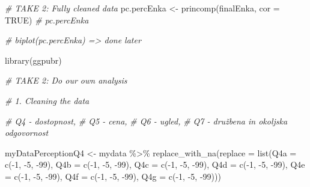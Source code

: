 \documentclass[
]{article}
\newenvironment{Shaded}{\begin{snugshade}}{\end{snugshade}}
\newcommand{\AttributeTok}[1]{\textcolor[rgb]{0.77,0.63,0.00}{#1}}
\newcommand{\CommentTok}[1]{\textcolor[rgb]{0.56,0.35,0.01}{\textit{#1}}}
\newcommand{\ConstantTok}[1]{\textcolor[rgb]{0.00,0.00,0.00}{#1}}
\newcommand{\DecValTok}[1]{\textcolor[rgb]{0.00,0.00,0.81}{#1}}
\newcommand{\FunctionTok}[1]{\textcolor[rgb]{0.00,0.00,0.00}{#1}}
\newcommand{\NormalTok}[1]{#1}
\newcommand{\OtherTok}[1]{\textcolor[rgb]{0.56,0.35,0.01}{#1}}
\newcommand{\SpecialCharTok}[1]{\textcolor[rgb]{0.00,0.00,0.00}{#1}}
\begin{document}
\begin{Shaded}
\begin{Highlighting}[]
\CommentTok{\# TAKE 2: Fully cleaned data}
\NormalTok{pc.percEnka }\OtherTok{\textless{}{-}} \FunctionTok{princomp}\NormalTok{(finalEnka, }\AttributeTok{cor =} \ConstantTok{TRUE}\NormalTok{)}
\CommentTok{\# pc.percEnka}

\CommentTok{\# biplot(pc.percEnka) =\textgreater{} done later}

\FunctionTok{library}\NormalTok{(ggpubr)}

\CommentTok{\# TAKE 2: Do our own analysis}

\CommentTok{\# 1. Cleaning the data}

\CommentTok{\# Q4 {-} dostopnost, }
\CommentTok{\# Q5 {-} cena, }
\CommentTok{\# Q6 {-} ugled, }
\CommentTok{\# Q7 {-} družbena in okoljska odgovornost}

\NormalTok{myDataPerceptionQ4 }\OtherTok{\textless{}{-}}\NormalTok{ mydata }\SpecialCharTok{\%\textgreater{}\%} \FunctionTok{replace\_with\_na}\NormalTok{(}\AttributeTok{replace =} \FunctionTok{list}\NormalTok{(}\AttributeTok{Q4a =} \FunctionTok{c}\NormalTok{(}\SpecialCharTok{{-}}\DecValTok{1}\NormalTok{, }\SpecialCharTok{{-}}\DecValTok{5}\NormalTok{, }\SpecialCharTok{{-}}\DecValTok{99}\NormalTok{), }\AttributeTok{Q4b =} \FunctionTok{c}\NormalTok{(}\SpecialCharTok{{-}}\DecValTok{1}\NormalTok{, }\SpecialCharTok{{-}}\DecValTok{5}\NormalTok{, }\SpecialCharTok{{-}}\DecValTok{99}\NormalTok{), }\AttributeTok{Q4c =} \FunctionTok{c}\NormalTok{(}\SpecialCharTok{{-}}\DecValTok{1}\NormalTok{, }\SpecialCharTok{{-}}\DecValTok{5}\NormalTok{, }\SpecialCharTok{{-}}\DecValTok{99}\NormalTok{), }\AttributeTok{Q4d =} \FunctionTok{c}\NormalTok{(}\SpecialCharTok{{-}}\DecValTok{1}\NormalTok{, }\SpecialCharTok{{-}}\DecValTok{5}\NormalTok{, }\SpecialCharTok{{-}}\DecValTok{99}\NormalTok{), }\AttributeTok{Q4e =} \FunctionTok{c}\NormalTok{(}\SpecialCharTok{{-}}\DecValTok{1}\NormalTok{, }\SpecialCharTok{{-}}\DecValTok{5}\NormalTok{, }\SpecialCharTok{{-}}\DecValTok{99}\NormalTok{), }\AttributeTok{Q4f =} \FunctionTok{c}\NormalTok{(}\SpecialCharTok{{-}}\DecValTok{1}\NormalTok{, }\SpecialCharTok{{-}}\DecValTok{5}\NormalTok{, }\SpecialCharTok{{-}}\DecValTok{99}\NormalTok{), }\AttributeTok{Q4g =} \FunctionTok{c}\NormalTok{(}\SpecialCharTok{{-}}\DecValTok{1}\NormalTok{, }\SpecialCharTok{{-}}\DecValTok{5}\NormalTok{, }\SpecialCharTok{{-}}\DecValTok{99}\NormalTok{)))}


\end{Highlighting}
\end{Shaded}
\end{document}
